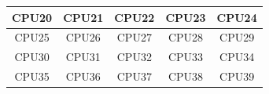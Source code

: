 \documentclass[IN,11pt,twoside,openright,master,english]{tumthesis}
\begin{document}
\begin{figure}[h]
{{\begin{tabular}[htp]{|c|c|c|c|c|}
\hline
\cellcolor{TUMBlue!0} CPU20 & \cellcolor{TUMBlue!92} CPU21 & \cellcolor{TUMBlue!0} CPU22 & \cellcolor{TUMBlue!0} CPU23 & \cellcolor{TUMBlue!0} CPU24 \\
\hline
\cellcolor{TUMBlue!0} CPU25 & \cellcolor{TUMBlue!0} CPU26 & \cellcolor{TUMBlue!0} CPU27 & \cellcolor{TUMBlue!0} CPU28 & \cellcolor{TUMBlue!0} CPU29 \\
\hline
\cellcolor{TUMBlue!0} CPU30 & \cellcolor{TUMBlue!92} CPU31 & \cellcolor{TUMBlue!0} CPU32 & \cellcolor{TUMBlue!2} CPU33 & \cellcolor{TUMBlue!0} CPU34 \\
\hline
\cellcolor{TUMBlue!0} CPU35 & \cellcolor{TUMBlue!1} CPU36 & \cellcolor{TUMBlue!0} CPU37 & \cellcolor{TUMBlue!0} CPU38 & \cellcolor{TUMBlue!0} CPU39 \\
\hline
			\end{tabular}
		}
	}
	

\end{figure}
\end{document}
